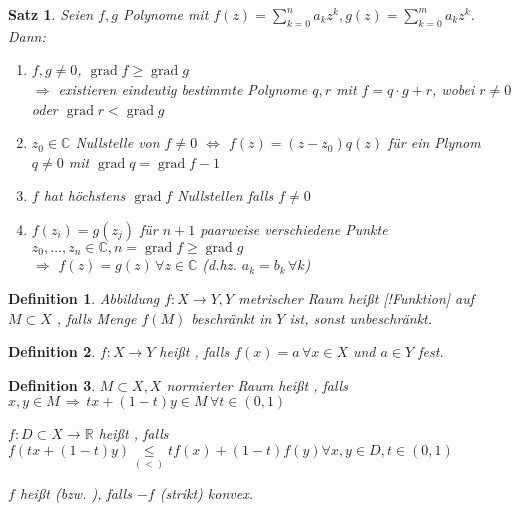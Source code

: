 \documentclass[ngerman,a4paper]{report}
\theoremstyle{break}
\newtheorem{satz}[theorem]{Satz}
\newtheorem*{definition}{Definition}
\DeclareMathOperator{\grad}{grad}
\begin{document}
\begin{satz}\label{Polynomdiv}
	Seien $f,g$ Polynome mit $f(z) = \sum_{k=0}^n a_k z^k, g(z) = \sum_{k=0}^m a_k z^k$. Dann:
	\begin{enumerate}[label={\arabic*)}]
		\item $f,g\neq 0$, $\grad f\ge \grad g$\\
		$\Rightarrow$ existieren eindeutig bestimmte Polynome $q,r$ mit $f = q\cdot g + r$, wobei $r\neq 0$ oder $\grad r < \grad g$
		\item $z_0\in\mathbb{C}$ Nullstelle von $f\neq 0$ $\Leftrightarrow$ $f(z) = (z - z_0)q(z)$ für ein Plynom $q\neq 0$ mit $\grad q = \grad f -1$
		\item $f$ hat höchstens $\grad f$ Nullstellen falls $f\neq 0$
		\item $f(z_i) = g(z_j)$ für $n+1$ paarweise verschiedene Punkte $z_0, \dotsc, z_n\in\mathbb{C}, n = \grad f \ge \grad g$\\
		$\Rightarrow$ $f(z) = g(z) \,\forall z\in\mathbb{C}$ (d.hz. $a_k = b_k\,\forall k$)
	\end{enumerate}
\end{satz}
\begin{definition}
	Abbildung $f:X\rightarrow Y, Y$ metrischer Raum heißt [!Funktion] auf $M\subset X$ , falls Menge $f(M)$ beschränkt in $Y$ ist, sonst unbeschränkt.
\end{definition}
\begin{definition}
	$f:X\to Y$ heißt , falls $f(x) = a\,\forall x\in X$ und $a\in Y$ fest.
\end{definition}
\begin{definition}
	$M\subset X, X$ normierter Raum heißt , falls $x,y\in M \,\Rightarrow \,tx+(1-t)y \in M\,\forall t\in(0,1)$
	
	$f:D\subset X\to \mathbb{R}$ heißt , falls $f(tx + (1-t)y) \underset{(<)}{\le} t f(x) + (1-t)f(y)\forall x,y\in D, t\in(0,1)$
	
	$f$ heißt  (bzw. ), falls $-f$ (strikt) konvex.
\end{definition}
\end{document}
